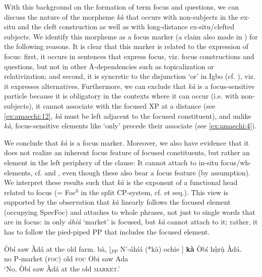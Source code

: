 \documentclass[output=paper,colorlinks,citecolor=brown]{langscibook}
\begin{document}
With this background on the formation of term focus and questions, we can discuss the nature of the morpheme \textit{k\`a} that occurs with non-subjects in the ex-situ and the cleft construction as well as with long-distance ex-situ\slash clefted subjects. We identify this morpheme as a focus marker (a claim also  made in \citealt{Osuagwu2015}) for the following reasons. It is clear that this marker is related to the expression of focus: first, it occurs in sentences that express focus, viz. focus constructions and questions, but not in other \=A-dependencies such as topicalization or relativization; and second, it is syncretic to the disjunction `or' in Igbo (cf. \citealt{Nwachukwu1987}), viz. it expresses alternatives. Furthermore, we can exclude that \textit{k\`a} is a focus-sensitive particle because it is obligatory in the contexts where it can occur (i.e. with non-subjects), it cannot associate with the focused XP at a distance (see \ref{ex:amaechi:12}, \textit{k\`a} must be left adjacent to the focused constituent), and unlike \textit{k\`a}, focus-sensitive elements like `only' precede their associate (see \ref{ex:amaechi:4}).

\z

We conclude that \textit{k\`a} is a focus marker. Moreover, we also have evidence that it does not realize an inherent focus feature of focused constituents, but rather an element in the left periphery of the clause:  It  cannot attach to in-situ focus\slash wh-elements, cf.  and , even though these also bear a focus feature (by assumption). We interpret these results such that \textit{k\`a} is the exponent of a functional head related to focus (= Foc$^{0}$ in the split CP-system, cf. \citealt{Rizzi1997} et seq.). This view is supported by the observation that \textit{k\`a} linearly follows the focused element (occupying SpecFoc) and attaches to whole phrases, not just to single words that are in focus: in  only \textit{áhíá} `market' is focused, but \textit{k\`a} cannot  attach to it; rather, it has to follow the pied-piped PP that includes the focused element.

\ea%
    \label{ex:amaechi:13}
    \ea\label{ex:amaechi:13a}
        Òbí saw Àdá at the old farm.
    \ex\label{ex:amaechi:13b}
        bà, [$_{PP}$ N'-áhíá (*kà) ochie ] \textbf{kà} {} Òbí hụ̀rụ̀ Àdá.\\
                no {} P-market (\textsc{foc}) old {} \textsc{foc} {} Obi saw Ada\\
        \glt    `No, Òbí saw Àdá at the {old} \textsc{market}.'%
    \z
\z
\end{document}
